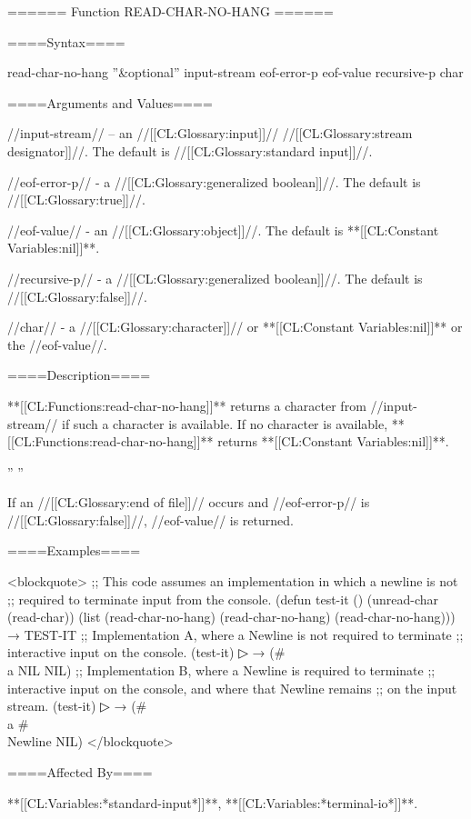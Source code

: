 ====== Function READ-CHAR-NO-HANG ======

====Syntax====

\DefunWithValues read-char-no-hang {''&optional'' input-stream eof-error-p eof-value recursive-p} {char}

====Arguments and Values====

//input-stream// -- an //[[CL:Glossary:input]]// //[[CL:Glossary:stream designator]]//. The default is //[[CL:Glossary:standard input]]//.

//eof-error-p// - a //[[CL:Glossary:generalized boolean]]//. The default is //[[CL:Glossary:true]]//.

//eof-value// - an //[[CL:Glossary:object]]//. The default is **[[CL:Constant Variables:nil]]**.

//recursive-p// - a //[[CL:Glossary:generalized boolean]]//. The default is //[[CL:Glossary:false]]//.

//char// - a //[[CL:Glossary:character]]// or **[[CL:Constant Variables:nil]]** or the //eof-value//.

====Description====

**[[CL:Functions:read-char-no-hang]]** returns a character from //input-stream// if such a character is available. If no character is available, **[[CL:Functions:read-char-no-hang]]** returns **[[CL:Constant Variables:nil]]**.

{'' ''}{\ExplainRecursiveP}

If an //[[CL:Glossary:end of file]]// occurs and //eof-error-p// is //[[CL:Glossary:false]]//, //eof-value// is returned.

====Examples====

<blockquote> ;; This code assumes an implementation in which a newline is not ;; required to terminate input from the console. (defun test-it () (unread-char (read-char)) (list (read-char-no-hang) (read-char-no-hang) (read-char-no-hang))) → TEST-IT ;; Implementation A, where a Newline is not required to terminate ;; interactive input on the console. (test-it)
▷  → (#\\a NIL NIL) ;; Implementation B, where a Newline is required to terminate ;; interactive input on the console, and where that Newline remains ;; on the input stream. (test-it)
▷  → (#\\a #\\Newline NIL) </blockquote>

====Affected By====

**[[CL:Variables:*standard-input*]]**, **[[CL:Variables:*terminal-io*]]**.

